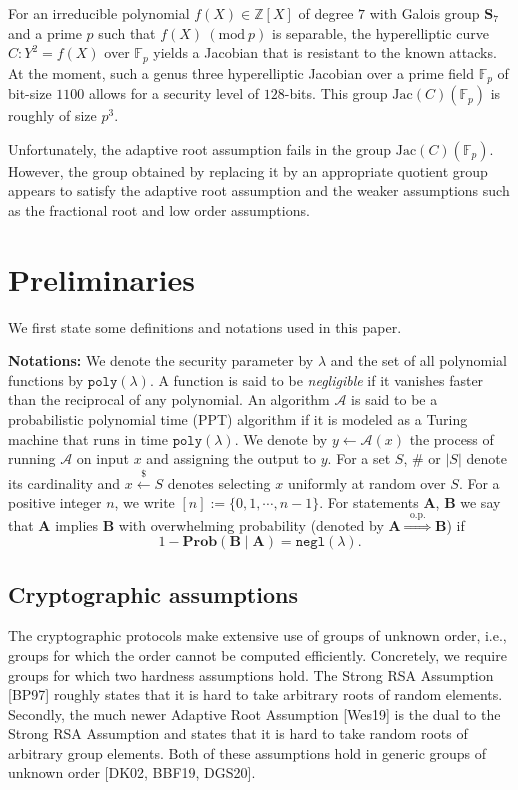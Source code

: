 \documentclass[11pt, lettersize, notitlepage, leqno, footskip=0.6cm]{article}
\newcommand{\bz}{\mathbb Z}
\newcommand{\bFp}{\mathbb{F}_p}
\newcommand{\ttt}{\texttt}
\newcommand{\negl}{\ttt{{negl}}}
\newcommand{\impop}{\overset{\;\;\mr{o.p.}\;\;}{\Longrightarrow}}
\newcommand{\mc}{\mathcal}
\newcommand{\mbf}{\mathbf}
\newcommand{\mr}{\mathrm}
\newcommand{\Jac}{\mr{Jac}}
\newcommand{\lam}{\lambda}
\newcommand{\vs}{\vspace{-0.15cm}}
\newcommand{\noin}{\noindent}
\newcommand{\op}{overwhelming probability}
\newcommand{\Mod}[1]{\ (\mathrm{mod}\ #1)}
\numberwithin{equation}{section}
\begin{document}
\begin{enumerate}[wide, labelwidth=!, labelindent=0pt]
For an irreducible polynomial $f(X)\in \bz[X]$ of degree $7$ with Galois group $\mbf{S}_7$ and a prime $p$ such that $f(X)\Mod{p}$ is separable, the hyperelliptic curve $C:Y^2 = f(X)$ over $\bFp$ yields a Jacobian that is resistant to the known attacks. At the moment, such a genus three hyperelliptic Jacobian over a prime field $\bFp$ of bit-size $1100$ allows for a security level of $128$-bits. This group $\Jac(C)(\bFp)$ is roughly of size $p^3$.

Unfortunately, the adaptive root assumption fails in the group $\Jac(C)(\bFp)$. However, the group obtained by replacing it by an appropriate quotient group appears to satisfy the adaptive root assumption and the weaker assumptions such as the fractional root and low order assumptions. \end{enumerate}


\section{\fontsize{12}{12} Preliminaries}

\noin We first state some definitions and notations used in this paper. \vspace{0.15cm}

\noin \textbf{Notations:} We denote the security parameter by $\lam$ and the set of all polynomial functions by $\ttt{poly}(\lam)$. A function is said to be \textit{negligible} if it vanishes faster than the reciprocal of any polynomial. An algorithm $\mc{A}$ is said to be a probabilistic polynomial time  (PPT) algorithm if it is modeled as a Turing machine that runs in time $\ttt{poly}(\lam)$. We denote by $y\gets \mc{A}(x)$ the process of running $\mc{A}$ on input $x$ and assigning the output to $y$. For a set $S$, $\#$ or $|S|$ denote its cardinality and $x\xleftarrow{\$} S$ denotes selecting $x$ uniformly at random over $S$. For a positive integer $n$, we write $[n]:=\{0,1,\cdots,n-1\}$. For statements $\mbf{A}$, $\mbf{B}$ we say that $\mbf{A}$ implies $\mbf{B}$ with \op\;  (denoted by $\mbf{A}\impop \mbf{B}$) if \vs $$1 - \mbf{Prob}(\mbf{B}\;\big|\;\mbf{A}) = \negl(\lam).$$

\subsection{\fontsize{11}{11} Cryptographic assumptions}

\noin The cryptographic protocols make extensive use of groups of unknown order, i.e., groups for
which the order cannot be computed efficiently. Concretely, we require groups for which two hardness assumptions hold. The Strong RSA Assumption [BP97] roughly states that it is hard to take arbitrary roots of random elements. Secondly, the much newer Adaptive Root Assumption [Wes19] is the dual to the Strong RSA Assumption and states that it is hard to take random roots of arbitrary group elements. Both of these
assumptions hold in generic groups of unknown order [DK02, BBF19, DGS20].
\end{document}
